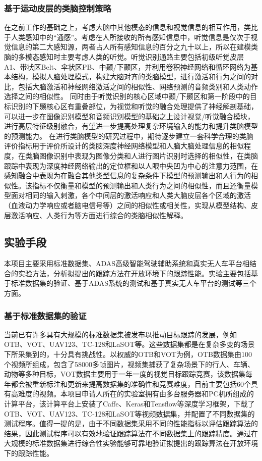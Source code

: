 \documentclass[a4paper,zihao=-4]{article}
\begin{document}
\subsubsection{基于运动皮层的类脑控制策略}
在之前工作的基础之上，考虑大脑中其他模态的信息和视觉信息的相互作用，类比于人类感知中的“通感”。考虑在人所接收的所有感知信息中，听觉信息是仅次于视觉信息的第二大感知源，两者占人所有感知信息的百分之九十以上，所以在建模类脑的多模态感知时主要考虑人类的听觉。听觉识别通路主要包括初级听觉皮层A1、带状区Belt、伞状区PB、中颞/下颞区，并利用卷积神经网络和循环网络为基本结构，模拟人脑处理模式，构建大脑对齐的类脑模型，进行激活和行为之间的对比，包括大脑激活和神经网络激活之间的相似性、网络预测的音频类别和人类动作选择之间的相似性。
同时由于听觉识别的核心区域中颞/下颞区和第一阶段中的目标识别的下颞核心区有重叠部位，为视觉和听觉的融合处理提供了神经解剖基础，可以进一步在图像识别模型和音频识别模型的基础之上设计视觉/听觉融合模块，进行高层特征级别融合，有望进一步提高处理复杂环境输入的能力和提升类脑模型的预测能力。
在进行类脑模型的研究过程中，期待逐步建立一套科学合理的类脑评价指标用于评价所设计的类脑深度神经网络模型和人脑大脑处理信息的相似程度，在类脑图像识别中表现为图像分类和人进行图片识别时选择的相似性，在类脑跟踪中表现为深度神经网络输出的定位框和以人眼中央凹为中心的注意力范围，在感知融合中表现为在融合其他类型信息的复杂条件下模型的预测输出和人行为的相似性。该指标不仅衡量和模型的预测输出和人类行为之间的相似性，而且还衡量模型面对相同的输入刺激，各个中间层的激活响应和人类大脑皮层各个区域的激活（血液动力学响应或者脑电信号等）之间的相似性或相关性，实现从模型结构、皮层激活响应、人类行为等方面进行综合的类脑相似性解释。


\subsection{实验手段}
本项目主要采用标准数据集、ADAS高级智能驾驶辅助系统和真实无人车平台相结合的实验方法，分析拟提出的跟踪方法在开放环境下的跟踪性能。实验主要包括基于标准数据集的验证、基于ADAS系统的测试和基于真实无人车平台的测试等三个方面。

\subsubsection{基于标准数据集的验证}
当前已有许多具有大规模的标准数据集被发布以推动目标跟踪的发展，例如OTB、VOT、UAV123、TC-128和LaSOT等。这些数据集都是在复杂多变的场景下所采集到的，十分具有挑战性。以权威的OTB和VOT为例，OTB数据集由100个视频所组成，包含了58000多帧图片，视频集捕获了复杂场景下的行人、车辆、动物等多种目标，VOT数据主要用于一年一度的视觉目标跟踪竞赛，该数据集每年都会被重新标注和更新来提高数据集的准确性和竞赛难度，目前主要包括60个具有高难度的视频。本项目申请人所在的实验室拥有由多台服务器和PC机所组成的计算平台，该计算平台上安装了Caffe、Keras和Tensflow等深度学习框架，下载了OTB、VOT、UAV123、TC-128和LaSOT等视频数据集，并配置了不同数据集的测试程序。值得一提的是，由于不同数据集采用不同的性能指标以评估跟踪算法的结果，因此测试程序可以有效地验证跟踪算法在不同数据集上的跟踪精度。通过在大规模的标准数据集进行综合性实验能够可靠地验证拟提出的跟踪算法在开放环境下的跟踪性能。
\end{document}
